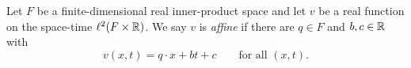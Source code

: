 \begin{definition}
Let $F$ be a finite-dimensional real inner-product space and let $v$ be a real
function on the space-time $\ell^2(F\times\mathbb{R})$. We say $v$ is \emph{affine} if
there are $q\in F$ and $b,c\in\mathbb{R}$ with
\[
  v(x,t)=q\cdot x+bt+c\qquad\text{for all }(x,t).
\]
\end{definition}

